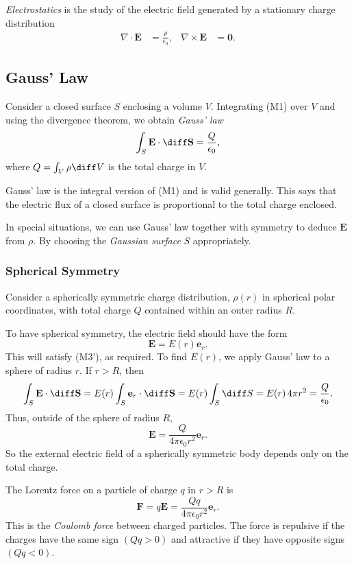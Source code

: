 \documentclass[12pt]{article}
\begin{document}
\emph{Electrostatics} is the study of the electric field generated by a stationary charge distribution
\begin{align*}
	\nabla \cdot \mathbf{E} &= \frac{\rho}{\epsilon_0}, & \nabla \times \mathbf{E} &= \mathbf{0}.
\end{align*}

\subsection{Gauss' Law}
\label{sub:gauss_law}

Consider a closed surface $S$ enclosing a volume $V$. Integrating (M1) over $V$ and using the divergence theorem, we obtain \emph{Gauss' law}
\[
\int_{S} \mathbf{E} \cdot \diff \mathbf{S} = \frac{Q}{\epsilon_0}
,\]
where $Q = \int_{V} \rho \diff V$ is the total charge in $V$.

Gauss' law is the integral version of (M1) and is valid generally. This says that the electric flux of a closed surface is proportional to the total charge enclosed.

In special situations, we can use Gauss' law together with symmetry to deduce $\mathbf{E}$ from $\rho$. By choosing the \emph{Gaussian surface} $S$ appropriately.

\subsubsection{Spherical Symmetry}
\label{subsub:spherical_symmetry}

Consider a spherically symmetric charge distribution, $\rho(r)$ in spherical polar coordinates, with total charge $Q$ contained within an outer radius $R$.

To have spherical symmetry, the electric field should have the form
\[
	\mathbf{E} = E(r) \mathbf{e}_r
.\]
This will satisfy (M3'), as required. To find $E(r)$, we apply Gauss' law to a sphere of radius $r$. If $r > R$, then
\[
\int_{S}\mathbf{E}\cdot \diff \mathbf{S} = E(r) \int_{S} \mathbf{e}_r \cdot \diff \mathbf{S} = E(r) \int_{S} \diff S = E(r) \, 4 \pi r^2 = \frac{Q}{\epsilon_0}
.\]
Thus, outside of the sphere of radius $R$,
\[
\mathbf{E} = \frac{Q}{4 \pi \epsilon_0 r^2}\mathbf{e}_r
.\]
So the external electric field of a spherically symmetric body depends only on the total charge.

The Lorentz force on a particle of charge $q$ in $r > R$ is
\[
\mathbf{F} = q \mathbf{E} = \frac{Qq}{4 \pi \epsilon_0 r^2} \mathbf{e}_r
.\]
This is the \emph{Coulomb force} between charged particles. The force is repulsive if the charges have the same sign $(Qq > 0)$ and attractive if they have opposite signs $(Qq < 0)$.
\end{document}
